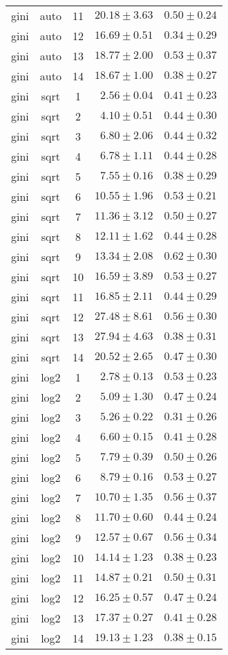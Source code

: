 \begin{tabular}{cccrr}
gini & auto & 11 & $20.18 \pm 3.63$ & $0.50 \pm 0.24$\\
gini & auto & 12 & $16.69 \pm 0.51$ & $0.34 \pm 0.29$\\
gini & auto & 13 & $18.77 \pm 2.00$ & $0.53 \pm 0.37$\\
gini & auto & 14 & $18.67 \pm 1.00$ & $0.38 \pm 0.27$\\
gini & sqrt & 1 & $2.56 \pm 0.04$ & $0.41 \pm 0.23$\\
gini & sqrt & 2 & $4.10 \pm 0.51$ & $0.44 \pm 0.30$\\
gini & sqrt & 3 & $6.80 \pm 2.06$ & $0.44 \pm 0.32$\\
gini & sqrt & 4 & $6.78 \pm 1.11$ & $0.44 \pm 0.28$\\
gini & sqrt & 5 & $7.55 \pm 0.16$ & $0.38 \pm 0.29$\\
gini & sqrt & 6 & $10.55 \pm 1.96$ & $0.53 \pm 0.21$\\
gini & sqrt & 7 & $11.36 \pm 3.12$ & $0.50 \pm 0.27$\\
gini & sqrt & 8 & $12.11 \pm 1.62$ & $0.44 \pm 0.28$\\
gini & sqrt & 9 & $13.34 \pm 2.08$ & $0.62 \pm 0.30$\\
gini & sqrt & 10 & $16.59 \pm 3.89$ & $0.53 \pm 0.27$\\
gini & sqrt & 11 & $16.85 \pm 2.11$ & $0.44 \pm 0.29$\\
gini & sqrt & 12 & $27.48 \pm 8.61$ & $0.56 \pm 0.30$\\
gini & sqrt & 13 & $27.94 \pm 4.63$ & $0.38 \pm 0.31$\\
gini & sqrt & 14 & $20.52 \pm 2.65$ & $0.47 \pm 0.30$\\
gini & log2 & 1 & $2.78 \pm 0.13$ & $0.53 \pm 0.23$\\
gini & log2 & 2 & $5.09 \pm 1.30$ & $0.47 \pm 0.24$\\
gini & log2 & 3 & $5.26 \pm 0.22$ & $0.31 \pm 0.26$\\
gini & log2 & 4 & $6.60 \pm 0.15$ & $0.41 \pm 0.28$\\
gini & log2 & 5 & $7.79 \pm 0.39$ & $0.50 \pm 0.26$\\
gini & log2 & 6 & $8.79 \pm 0.16$ & $0.53 \pm 0.27$\\
gini & log2 & 7 & $10.70 \pm 1.35$ & $0.56 \pm 0.37$\\
gini & log2 & 8 & $11.70 \pm 0.60$ & $0.44 \pm 0.24$\\
gini & log2 & 9 & $12.57 \pm 0.67$ & $0.56 \pm 0.34$\\
gini & log2 & 10 & $14.14 \pm 1.23$ & $0.38 \pm 0.23$\\
gini & log2 & 11 & $14.87 \pm 0.21$ & $0.50 \pm 0.31$\\
gini & log2 & 12 & $16.25 \pm 0.57$ & $0.47 \pm 0.24$\\
gini & log2 & 13 & $17.37 \pm 0.27$ & $0.41 \pm 0.28$\\
gini & log2 & 14 & $19.13 \pm 1.23$ & $0.38 \pm 0.15$\\
\bottomrule
\end{tabular}
